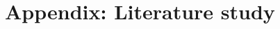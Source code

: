 \documentclass[tex/appendix.tex]{subfiles}
\begin{document}
    \label{app:literature_study}
    \section{Appendix: Literature study}
    
\end{document}
